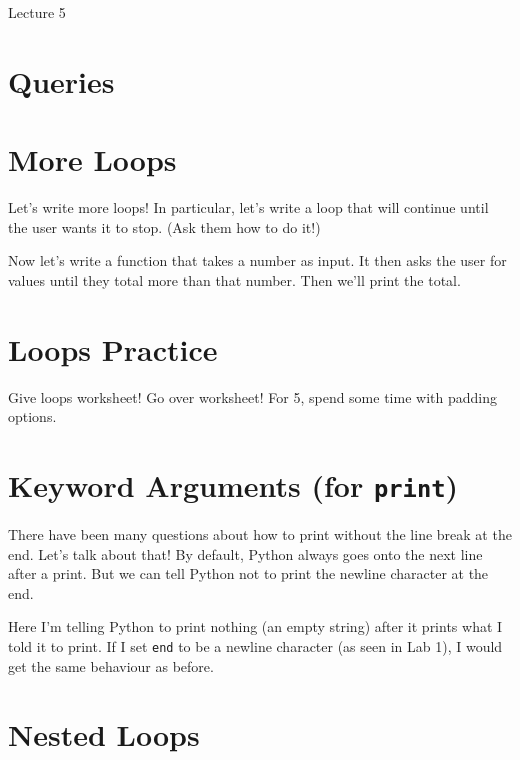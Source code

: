 \documentclass[12pt]{article}
\begin{document}
\begin{center}
   \LARGE Lecture 5
\end{center}

\setcounter{section}{-1}
\section{Queries}

\section{More Loops}

Let's write more loops!  In particular, let's write a loop that will continue
until the user wants it to stop.  (Ask them how to do it!)



\noindent
Now let's write a function that takes a number as input.  It then asks the user
for values until they total more than that number.  Then we'll print the total.



\section{Loops Practice}

Give loops worksheet!  Go over worksheet!  For 5, spend some time with
padding options.

\section{Keyword Arguments (for \lstinline{print})}

There have been many questions about how to print without the line break at the
end.  Let's talk about that!  By default, Python always goes onto the next line
after a print.  But we can tell Python not to print the newline character at
the end.



\noindent
Here I'm telling Python to print nothing (an empty string) after it prints what
I told it to print.  If I set \lstinline{end} to be a newline character (as
seen in Lab 1), I would get the same behaviour as before.

\section{Nested Loops}
\end{document}
